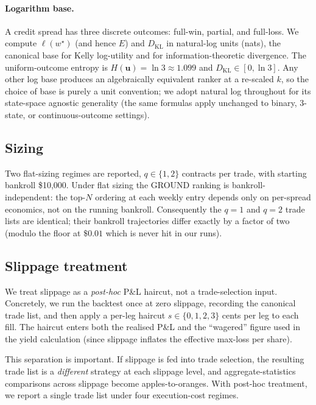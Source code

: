 \documentclass[11pt]{article}
\begin{document}
\paragraph{Logarithm base.} A credit spread has three discrete
outcomes: full-win, partial, and full-loss. We compute $\ell(w^\star)$
(and hence $E$) and $D_{\mathrm{KL}}$ in natural-log units (nats), the canonical base for
Kelly log-utility and for information-theoretic divergence. The
uniform-outcome entropy is $H(\mathbf{u}) = \ln 3 \approx 1.099$ and
$D_{\mathrm{KL}} \in [0, \ln 3]$. Any other log base produces an
algebraically equivalent ranker at a re-scaled $k$, so the choice of
base is purely a unit convention; we adopt natural log throughout for
its state-space agnostic generality (the same formulas apply
unchanged to binary, 3-state, or continuous-outcome settings).

\subsection{Sizing}

Two flat-sizing regimes are reported, $q \in \{1, 2\}$ contracts per
trade, with starting bankroll \$10{,}000. Under flat sizing the GROUND
ranking is bankroll-independent: the top-$N$ ordering at each weekly
entry depends only on per-spread economics, not on the running bankroll.
Consequently the $q=1$ and $q=2$ trade lists are identical; their
bankroll trajectories differ exactly by a factor of two (modulo the
floor at $\$0.01$ which is never hit in our runs).

\subsection{Slippage treatment}

We treat slippage as a \emph{post-hoc} P\&L haircut, not a
trade-selection input. Concretely, we run the backtest once at zero
slippage, recording the canonical trade list, and then apply a per-leg
haircut $s \in \{0, 1, 2, 3\}$ cents per leg to each fill. The haircut enters both the realised P\&L and the
``wagered'' figure used in the yield calculation (since slippage
inflates the effective max-loss per share).

This separation is important. If slippage is fed into trade selection,
the resulting trade list is a \emph{different} strategy at each
slippage level, and aggregate-statistics comparisons across slippage
become apples-to-oranges. With post-hoc treatment, we report a single
trade list under four execution-cost regimes.
\end{document}
